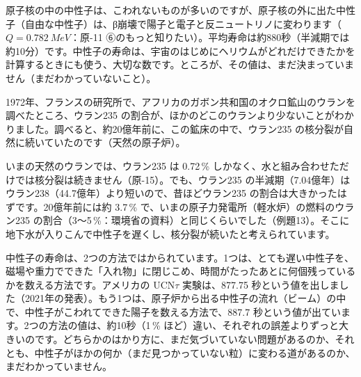 \begin{phmodel}[α崩壊のトンネル]
\end{phmodel}

\label{ph:原-12:sec11}
原子核の中の中性子は、こわれないものが多いのですが、原子核の外に出た中性子（自由な中性子）は、β崩壊で陽子と電子と反ニュートリノに変わります（$Q=\qty{0.782}{MeV}$：原-11 ⑥のもっと知りたい）。平均寿命は約880秒（半減期では約10分）です。中性子の寿命は、宇宙のはじめにヘリウムがどれだけできたかを計算するときにも使う、大切な数です。ところが、その値は、まだ決まっていません（まだわかっていないこと）。

\label{ph:原-12:sec12}
1972年、フランスの研究所で、アフリカのガボン共和国のオクロ鉱山のウランを調べたところ、ウラン235 の割合が、ほかのどこのウランより少ないことがわかりました。調べると、約20億年前に、この鉱床の中で、ウラン235 の核分裂が自然に続いていたのです（天然の原子炉）。

いまの天然のウランでは、ウラン235 は 0.72\,\% しかなく、水と組み合わせただけでは核分裂は続きません（原-15）。でも、ウラン235 の半減期（7.04億年）はウラン238（44.7億年）より短いので、昔ほどウラン235 の割合は大きかったはずです。20億年前には約 3.7\,\% で、いまの原子力発電所（軽水炉）の燃料のウラン235 の割合（3〜5\,\%：環境省の資料）と同じくらいでした（例題13）。そこに地下水が入りこんで中性子を遅くし、核分裂が続いたと考えられています。

\begin{phmada}
中性子の寿命は、2つの方法ではかられています。1つは、とても遅い中性子を、磁場や重力でできた「入れ物」に閉じこめ、時間がたったあとに何個残っているかを数える方法です。アメリカの UCN$\tau$ 実験は、877.75 秒という値を出しました（2021年の発表）。もう1つは、原子炉から出る中性子の流れ（ビーム）の中で、中性子がこわれてできた陽子を数える方法で、887.7 秒という値が出ています。2つの方法の値は、約10秒（1\,\% ほど）違い、それぞれの誤差よりずっと大きいのです。どちらかのはかり方に、まだ気づいていない問題があるのか、それとも、中性子がほかの何か（まだ見つかっていない粒）に変わる道があるのか、まだわかっていません。
\end{phmada}

